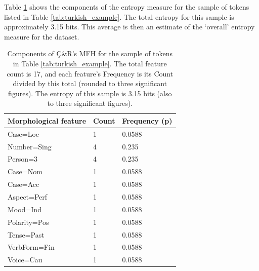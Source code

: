 \documentclass[USenglish]{article}
\begin{document}
\noindent Table \ref{tab:mfh} shows the components of the entropy measure for the sample of tokens listed in Table \ref{tab:turkish_example}.
The total entropy for this sample is approximately 3.15 bits.
This average is then an estimate of the `overall' entropy measure for the dataset.

\begin{table}[ht]
    \centering
    \caption{Components of Ç\&R's MFH for the sample of tokens in Table \ref{tab:turkish_example}. The total feature count is 17, and each feature's Frequency is its Count divided by this total (rounded to three significant figures). The entropy of this sample is 3.15 bits (also to three significant figures).} %
    \label{tab:mfh}   
    \begin{tabular}{p{5cm}p{3cm}p{3cm}}
\toprule
	\textbf{Morphological feature}	&	\textbf{Count}	&	\textbf{Frequency (p)}	\\
    \midrule
	Case=Loc&1&0.0588       \\    \midrule
	Number=Sing&4&0.235    \\    \midrule
        Person=3&4&0.235		   \\    \midrule
	Case=Nom&1&0.0588	       \\    \midrule
	Case=Acc&1&0.0588		      \\    \midrule
        Aspect=Perf&1&0.0588      \\    \midrule
        Mood=Ind&1&0.0588		   \\    \midrule
        Polarity=Pos&1&0.0588		\\    \midrule
	Tense=Past&1&0.0588	     \\    \midrule
	VerbForm=Fin&1&0.0588	    \\    \midrule
	Voice=Cau&1&0.0588      	\\ \bottomrule

    \end{tabular}
\end{table}
\end{document}
